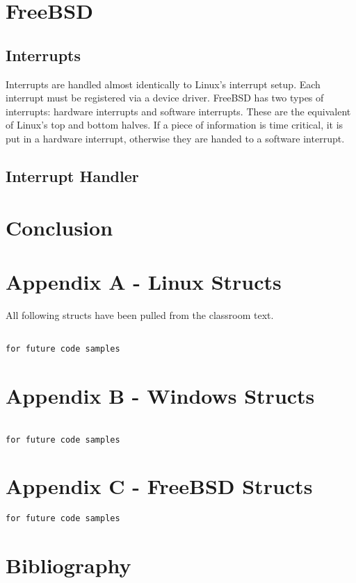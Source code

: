 \documentclass[10pt,letterpaper,onecolumn,draftclsnofoot]{IEEEtran}
\begin{document}
\section{FreeBSD}
 \subsection{Interrupts}
 Interrupts are handled almost identically to Linux's interrupt setup. Each
 interrupt must be registered via a device driver. FreeBSD has two types of
 interrupts: hardware interrupts and software interrupts. These are the equivalent
 of Linux's top and bottom halves. If a piece of information is time critical,
 it is put in a hardware interrupt, otherwise they are handed to a software
 interrupt. \cite{freebsd2016}
 \subsection{Interrupt Handler}

\section{Conclusion}

\clearpage
\section{Appendix A - Linux Structs}
All following structs have been pulled from the classroom text. \cite{robertlove2010}
\begin{lstlisting}

for future code samples

\end{lstlisting}

\section{Appendix B - Windows Structs}
\begin{lstlisting}

for future code samples
\end{lstlisting}
\section{Appendix C - FreeBSD Structs}
\begin{lstlisting}
for future code samples

\end{lstlisting}

\section{Bibliography}


\end{document}
